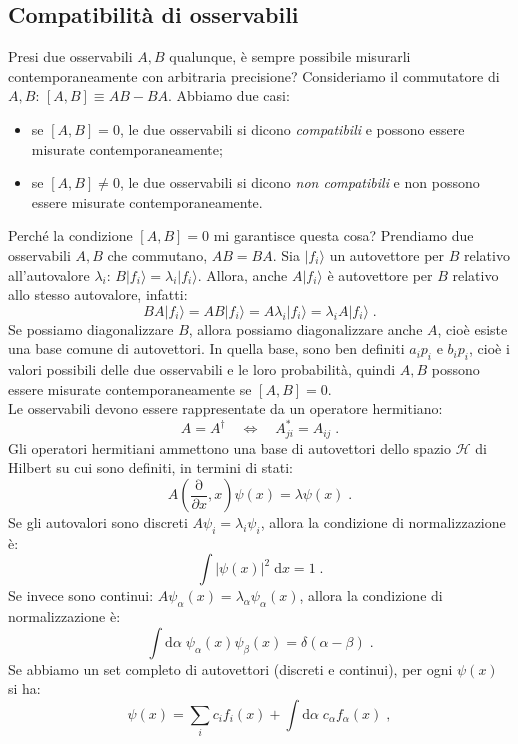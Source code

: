 \documentclass[10pt,a4paper]{report}
\theoremstyle{definition}
\newcommand{\ham}{\mathcal{H}}
\numberwithin{equation}{section}
\newcommand{\diff}[1][]{\mathrm{d}#1}
\newcommand{\ket}{\rangle}
\begin{document}
\subsection{Compatibilità di osservabili}
Presi due osservabili $A,B$ qualunque, è sempre possibile misurarli contemporaneamente con arbitraria precisione? Consideriamo il commutatore di $A,B$: $[A,B]\equiv AB-BA$. Abbiamo due casi:
\begin{itemize}
\item se $[A,B]=0$, le due osservabili si dicono \textit{compatibili} e possono essere misurate contemporaneamente;
\item se $[A,B]\ne0$, le due osservabili si dicono \textit{non compatibili} e non possono essere misurate contemporaneamente.
\end{itemize}
Perché la condizione $[A,B]=0$ mi garantisce questa cosa? Prendiamo due osservabili $A,B$ che commutano, $AB=BA$. Sia $|f_i\ket$ un autovettore per $B$ relativo all'autovalore $\lambda_i$: $B|f_i\ket=\lambda_i |f_i\ket$. Allora, anche $A|f_i\ket$ è autovettore per $B$ relativo allo stesso autovalore, infatti:
$$
BA|f_i\ket=AB|f_i\ket=A\lambda_i|f_i\ket=\lambda_iA|f_i\ket\;.
$$
Se possiamo diagonalizzare $B$, allora possiamo diagonalizzare anche $A$, cioè esiste una base comune di autovettori. In quella base, sono ben definiti $a_ip_i$ e $b_ip_i$, cioè i valori possibili delle due osservabili e le loro probabilità, quindi $A,B$ possono essere misurate contemporaneamente se $[A,B]=0$.
 \\
Le osservabili devono essere rappresentate da un operatore hermitiano: 
$$
A=A^{\dagger}\quad \Longleftrightarrow \quad A_{ji}^*=A_{ij}\;.
$$
Gli operatori hermitiani ammettono una base di autovettori dello spazio $\ham$ di Hilbert su cui sono definiti, in termini di stati:
$$
A\left(\frac{\mathrm{\partial}}{\partial x},x\right)\psi(x)=\lambda\psi(x)\;.
$$
Se gli autovalori sono discreti $A\psi_i=\lambda_i\psi_i$, allora la condizione di normalizzazione è:
\begin{equation}
\int |\psi(x)|^2\;\diff{x}=1\;.
\end{equation}
Se invece sono continui: $A\psi_{\alpha}(x)=\lambda_{\alpha}\psi_{\alpha}(x)$, allora la condizione di normalizzazione è:
\begin{equation}
\int\diff{\alpha}\;\psi_{\alpha}(x)\psi_{\beta}(x)=\delta(\alpha-\beta)\;.
\end{equation}
Se abbiamo un set completo di autovettori (discreti e continui), per ogni $\psi(x)$ si ha:
\begin{equation}
\psi(x)=\sum_i c_i f_i(x)+\int\diff{\alpha}\; c_{\alpha}f_{\alpha}(x)\;, \label{ch2_psisviluppo}
\end{equation}
\end{document}
